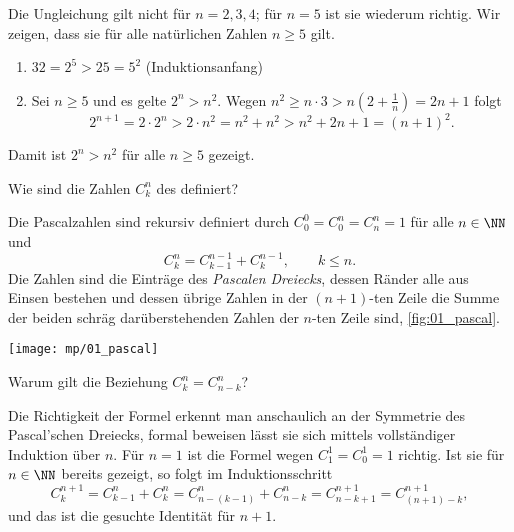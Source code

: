 \begin{antwort}
  Die Ungleichung gilt nicht für $n=2, 3, 4$; für $n=5$ ist sie wiederum richtig. Wir zeigen, dass sie für alle natürlichen Zahlen $n\ge 5$ gilt. 
  {\setlength{\labelsep}{4mm}
    \begin{enumerate}
    \item[\desc{i}] $32=2^5 > 25 = 5^2$ (Induktionsanfang) \\[-3.5mm]
    \item[\desc{ii}] Sei $n\ge 5$ und es gelte $2^n > n^2$. 
      Wegen $n^2\ge n\cdot 3> n\left(2+\frac 1n\right) = 2n+1$ folgt
      \[
      2^{n+1} = 2\cdot 2^n > 2\cdot n^2 = n^2+n^2 > n^2+2n+1 = (n+1)^2.
      \] 
    \end{enumerate}}
  Damit ist $2^n > n^2$ für alle $n \ge 5$ gezeigt.
  \AntEnd
\end{antwort}

\begin{frage}
  Wie sind die Zahlen $C_k^n$ des  definiert? 
\end{frage}

\begin{antwort}[]
  \Ant 
  Die Pascalzahlen sind rekursiv definiert durch  
  $C_0^0=C_0^n=C_n^n=1$ für alle $n\in\NN$ und 
  \[
  C_k^n = C_{k-1}^{n-1} + C_k^{n-1}, \qquad{k\le n}.
  \]
  \noindent
  Die Zahlen sind die Einträge des  
  \textit{Pascal\sch en Dreiecks}, 
  dessen Ränder alle aus Einsen bestehen 
  und dessen übrige Zahlen in der 
  $(n+1)$-ten Zeile die Summe der beiden schräg darüberstehenden 
  Zahlen der $n$-ten Zeile sind, \sieheAbbildung\ref{fig:01_pascal}. 
  \AntEnd

  \begin{center}
    \texttt{[image: mp/01\_pascal]}
    \label{fig:01_pascal}
  \end{center}
\end{antwort}


\begin{frage}
  Warum gilt die Beziehung $C_k^n=C_{n-k}^n$?
\end{frage}

\begin{antwort}
  Die Richtigkeit der Formel erkennt man anschaulich 
  an der Symmetrie des Pascal'schen Dreiecks, formal beweisen  
  lässt sie sich mittels vollständiger Induktion über $n$. 
  Für $n=1$ ist die Formel wegen $C_1^1=C_0^1=1$ richtig. Ist sie 
  für $n\in\NN$ bereits gezeigt, so folgt im Induktionsschritt
  \[
  C_k^{n+1} =
  C_{k-1}^n + C_k^n = 
  C_{n-(k-1)}^n+C_{n-k}^n =
  C^{n+1}_{n-k+1} =
  C^{n+1}_{(n+1)-k},
  \]
  und das ist die gesuchte Identität für $n+1$.
  \AntEnd
\end{antwort}






